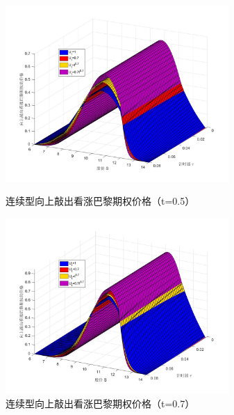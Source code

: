 \documentclass{ctexart} %
\begin{document}
\begin{figure}[H]
\begin{minipage}{0.48\linewidth}
\includegraphics[width=8.5cm]{code/bt0.5.jpg}
\caption{连续型向上敲出看涨巴黎期权价格（t=0.5）}
\end{minipage}
\begin{minipage}{0.48\linewidth}
\includegraphics[width=8.5cm]{code/bt0.7.jpg}
\caption{连续型向上敲出看涨巴黎期权价格（t=0.7）}
\end{minipage}
\end{figure}
\end{document}
